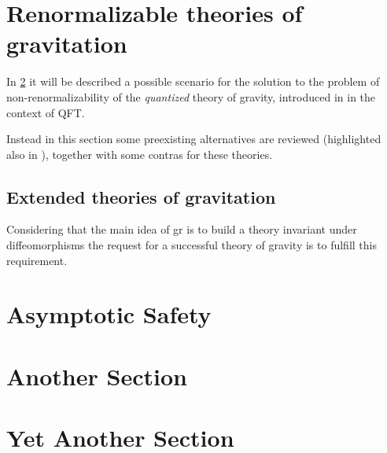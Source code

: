 \section{Renormalizable theories of gravitation}
\label{sec:ReThGrav}

In \cref{sec:AsSty} it will be described a possible scenario for the solution to the problem of non-renormalizability of the \textit{quantized} theory of gravity, introduced in \cite{Weinberg1979} in the context of QFT.
\newline

Instead in this section some preexisting alternatives are reviewed (highlighted also in \cite{Weinberg1979}), together with some contras for these theories.


\subsection{Extended theories of gravitation}


Considering that the main idea of \acrshort{gr} is to build a theory invariant under diffeomorphisms the request for a successful theory of gravity is to fulfill this requirement.


\section{Asymptotic Safety}
\label{sec:AsSty}

\lipsum


\section{Another Section}
\label{sec:AnSec}

\lipsum

\section{Yet Another Section}
\label{sec:YAnSec}

\lipsum
